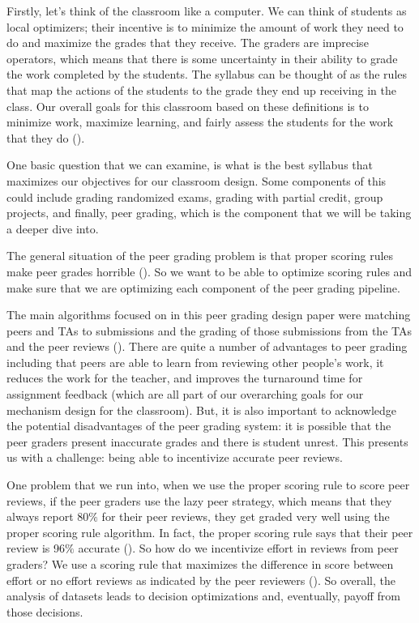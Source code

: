 \documentclass[
  letterpaper,
  numbers=noenddot,
  DIV=11,
  oneside]{scrreprt}
\theoremstyle{remark}
\begin{document}
Firstly, let's think of the classroom like a computer. We can think of
students as local optimizers; their incentive is to minimize the amount
of work they need to do and maximize the grades that they receive. The
graders are imprecise operators, which means that there is some
uncertainty in their ability to grade the work completed by the
students. The syllabus can be thought of as the rules that map the
actions of the students to the grade they end up receiving in the class.
Our overall goals for this classroom based on these definitions is to
minimize work, maximize learning, and fairly assess the students for the
work that they do ().

One basic question that we can examine, is what is the best syllabus
that maximizes our objectives for our classroom design. Some components
of this could include grading randomized exams, grading with partial
credit, group projects, and finally, peer grading, which is the
component that we will be taking a deeper dive into.

The general situation of the peer grading problem is that proper scoring
rules make peer grades horrible (). So we want to be able to optimize scoring rules and make
sure that we are optimizing each component of the peer grading pipeline.

The main algorithms focused on in this peer grading design paper were
matching peers and TAs to submissions and the grading of those
submissions from the TAs and the peer reviews
(). There are quite a
number of advantages to peer grading including that peers are able to
learn from reviewing other people's work, it reduces the work for the
teacher, and improves the turnaround time for assignment feedback (which
are all part of our overarching goals for our mechanism design for the
classroom). But, it is also important to acknowledge the potential
disadvantages of the peer grading system: it is possible that the peer
graders present inaccurate grades and there is student unrest. This
presents us with a challenge: being able to incentivize accurate peer
reviews.

One problem that we run into, when we use the proper scoring rule to
score peer reviews, if the peer graders use the lazy peer strategy,
which means that they always report 80\(\%\) for their peer reviews,
they get graded very well using the proper scoring rule algorithm. In
fact, the proper scoring rule says that their peer review is 96\(\%\)
accurate (). So how do we
incentivize effort in reviews from peer graders? We use a scoring rule
that maximizes the difference in score between effort or no effort
reviews as indicated by the peer reviewers
(). So overall, the
analysis of datasets leads to decision optimizations and, eventually,
payoff from those decisions.
\end{document}
